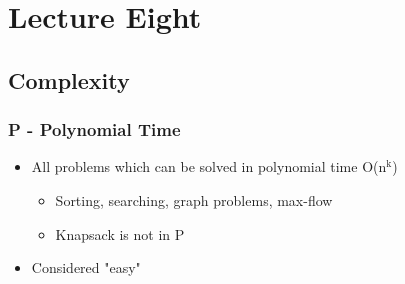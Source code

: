\documentclass[11pt]{article}
\begin{document}
\section*{Lecture Eight}
\label{sec:org8f7a5b6}
\subsection*{Complexity}
\label{sec:org1df95b6}
\subsubsection*{P - Polynomial Time}
\label{sec:org2586ddd}
\begin{itemize}
\item All problems which can be solved in polynomial time O(n\(^{\text{k}}\))
\begin{itemize}
\item Sorting, searching, graph problems, max-flow
\item Knapsack is not in P
\end{itemize}
\item Considered "easy"
\end{itemize}
\end{document}

